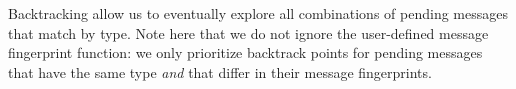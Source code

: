 Backtracking allow us to eventually explore all combinations of pending messages that
match by type. Note here that we do not ignore the user-defined message
fingerprint function: we only prioritize backtrack points for pending messages that
have the same type {\em and} that differ in their message fingerprints.




%
%
%
%
%
%
%
%


